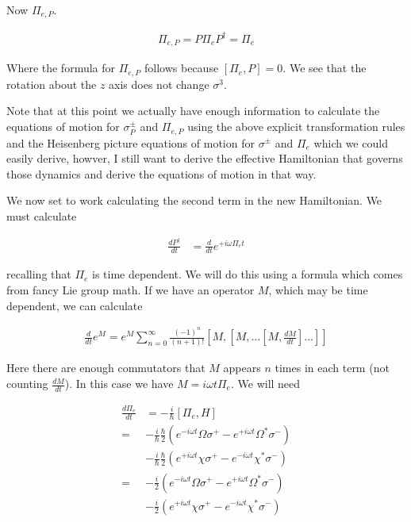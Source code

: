 \documentclass[12pt]{article}
\newcommand{\ddt}[1]{\frac{d #1}{dt}}
\begin{document}
Now $\Pi_{e,P}$.

\begin{align}
\Pi_{e,P} = P\Pi_e P^{\dag} = \Pi_e
\end{align}

Where the formula for $\Pi_{e,P}$ follows because $[\Pi_e,P]=0$. We see that the rotation about the $z$ axis does not change $\sigma^3$.

Note that at this point we actually have enough information to calculate the equations of motion for $\sigma^{\pm}_P$ and $\Pi_{e,P}$ using the above explicit transformation rules and the Heisenberg picture equations of motion for $\sigma^{\pm}$ and $\Pi_e$ which we could easily derive, howver, I still want to derive the effective Hamiltonian that governs those dynamics and derive the equations of motion in that way.



We now set to work calculating the second term in the new Hamiltonian. We must calculate

\begin{align}
\ddt{P^{\dag}} &= \ddt{} e^{+i\omega \Pi_e t}
\end{align}

recalling that $\Pi_e$ is time dependent. We will do this using a formula which comes from fancy Lie group math. If we have an operator $M$, which may be time dependent, we can calculate

\begin{align}
\ddt{}e^{M} = e^M \sum_{n=0}^{\infty} \frac{(-1)^n}{(n+1)!}\left[M,\left[M,\ldots\left[M,\ddt{M}\right]\ldots\right]\right]
\end{align}

Here there are enough commutators that $M$ appears $n$ times in each term (not counting $\ddt{M}$).
In this case we have $M = i\omega t \Pi_e$. We will need 

\begin{align}
\ddt{\Pi_e} &= -\frac{i}{\hbar} [\Pi_e,H]\\
=&-\frac{i}{\hbar} \frac{\hbar}{2} \left(e^{-i\omega t} \Omega \sigma^+ - e^{+i\omega t}\Omega^* \sigma^- \right)\\
&-\frac{i}{\hbar} \frac{\hbar}{2} \left(e^{+i\omega t} \chi \sigma^+ - e^{-i\omega t}\chi^* \sigma^- \right)\\
=&-\frac{i}{2} \left(e^{-i\omega t} \Omega \sigma^+ - e^{+i\omega t}\Omega^* \sigma^- \right)\\
&-\frac{i}{2} \left(e^{+i\omega t} \chi \sigma^+ - e^{-i\omega t}\chi^* \sigma^- \right)\\
\end{align}
\end{document}
